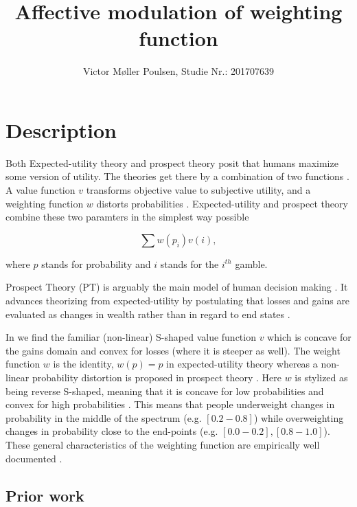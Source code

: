 \documentclass[12pt]{article}
\title{Affective modulation of weighting function}
\author{Victor Møller Poulsen, Studie Nr.: 201707639}
\begin{document}
\maketitle
\leavevmode

\section{Description}
Both Expected-utility theory and prospect theory
posit that humans maximize some version of
utility. The theories get there by a
combination of two functions
\autocite{rottenstreich2001money}.
A value function $v$ transforms objective value to
subjective utility, and a weighting function $w$
distorts probabilities \autocite{rottenstreich2001money,
gonzalez1999shape}. Expected-utility and
prospect theory combine these two paramters in
the simplest way possible
\autocite{rottenstreich2001money}

\[
	\sum w(p_i)v(i),
\]

where $p$ stands for probability and $i$ stands for the
$i^{th}$ gamble.

Prospect Theory \autocite{PT,
tversky1992advances} (PT) is arguably the main model
of human decision making \autocite{
newell2015straight}. It advances theorizing
from expected-utility by postulating that losses and
gains are evaluated as changes in wealth rather
than in regard to end states \autocite{newell2015straight}.

\vspace{3mm}

In \textcite{PT} we find the familiar
(non-linear) S-shaped
value function $v$ which is concave for the gains
domain and convex for losses (where it is steeper as well).
The weight function $w$ is the identity,
$w(p) = p$ in expected-utility theory
\autocite{rottenstreich2001money} whereas
a non-linear probability distortion is proposed in
prospect theory \autocite{PT}. Here $w$
is stylized as being reverse S-shaped,
meaning that it is concave for low probabilities
and convex for high probabilities \textcite{
gonzalez1999shape}. This means that
people underweight changes in probability in
the middle of the spectrum (e.g. $[0.2-0.8]$)
while overweighting changes in probability close
to the end-points (e.g. $[0.0 - 0.2], [0.8 - 1.0]$).
These general characteristics of the weighting
function are empirically well documented
\autocite{tversky1992advances,
wu1996curvature}.

\subsection{Prior work}
\end{document}
